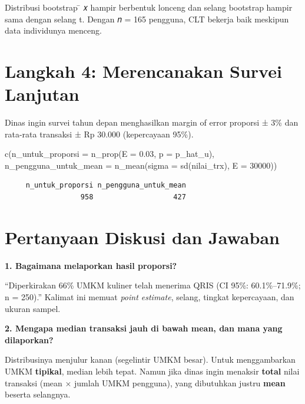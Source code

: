 \documentclass[
  indonesian,
  letterpaper,
]{book}
\newenvironment{Shaded}{\begin{snugshade}}{\end{snugshade}}
\newcommand{\AttributeTok}[1]{\textcolor[rgb]{0.40,0.45,0.13}{#1}}
\newcommand{\DecValTok}[1]{\textcolor[rgb]{0.68,0.00,0.00}{#1}}
\newcommand{\FloatTok}[1]{\textcolor[rgb]{0.68,0.00,0.00}{#1}}
\newcommand{\FunctionTok}[1]{\textcolor[rgb]{0.28,0.35,0.67}{#1}}
\newcommand{\NormalTok}[1]{\textcolor[rgb]{0.00,0.23,0.31}{#1}}
\begin{document}
Distribusi bootstrap ̄ 𝑥 hampir berbentuk lonceng dan selang bootstrap
hampir sama dengan selang t. Dengan 𝑛 = 165 pengguna, CLT bekerja baik
meskipun data individunya menceng.

\section{Langkah 4: Merencanakan Survei
Lanjutan}\label{langkah-4-merencanakan-survei-lanjutan}

Dinas ingin survei tahun depan menghasilkan margin of error proporsi ±
3\% dan rata-rata transaksi ± Rp 30.000 (kepercayaan 95\%).

\begin{Shaded}
\begin{Highlighting}[]
\FunctionTok{c}\NormalTok{(}\AttributeTok{n\_untuk\_proporsi =} \FunctionTok{n\_prop}\NormalTok{(}\AttributeTok{E =} \FloatTok{0.03}\NormalTok{, }\AttributeTok{p =}\NormalTok{ p\_hat\_u),}
\AttributeTok{n\_pengguna\_untuk\_mean =} \FunctionTok{n\_mean}\NormalTok{(}\AttributeTok{sigma =} \FunctionTok{sd}\NormalTok{(nilai\_trx), }\AttributeTok{E =} \DecValTok{30000}\NormalTok{))}
\end{Highlighting}
\end{Shaded}

\begin{verbatim}
     n_untuk_proporsi n_pengguna_untuk_mean 
                  958                   427 
\end{verbatim}

\section{Pertanyaan Diskusi dan
Jawaban}\label{pertanyaan-diskusi-dan-jawaban}

\textbf{1. Bagaimana melaporkan hasil proporsi?}

``Diperkirakan 66\% UMKM kuliner telah menerima QRIS (CI 95\%:
60.1\%--71.9\%; n = 250).'' Kalimat ini memuat \emph{point estimate},
selang, tingkat kepercayaan, dan ukuran sampel.

\textbf{2. Mengapa median transaksi jauh di bawah mean, dan mana yang
dilaporkan?}

Distribusinya menjulur kanan (segelintir UMKM besar). Untuk
menggambarkan UMKM \textbf{tipikal}, median lebih tepat. Namun jika
dinas ingin menaksir \textbf{total} nilai transaksi (mean × jumlah UMKM
pengguna), yang dibutuhkan justru \textbf{mean} beserta selangnya.
\end{document}
